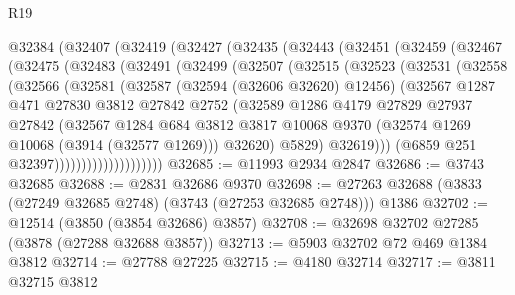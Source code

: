 \begin{lexlean}{R19}
\begin{coremodule}
    @32384
      (@32407
        (@32419
          (@32427
            (@32435
              (@32443
                (@32451
                  (@32459
                    (@32467
                      (@32475
                        (@32483
                          (@32491
                            (@32499
                              (@32507
                                (@32515
                                  (@32523
                                    (@32531
                                      (@32558
                                        (@32566
                                          (@32581
                                            (@32587
                                              (@32594 (@32606 @32620) @12456)
                                              (@32567
                                                @1287
                                                @471
                                                @27830
                                                @3812
                                                @27842
                                                @2752
                                                (@32589
                                                  @1286
                                                  @4179
                                                  @27829
                                                  @27937
                                                  @27842
                                                  (@32567
                                                    @1284
                                                    @684
                                                    @3812
                                                    @3817
                                                    @10068
                                                    @9370
                                                    (@32574 @1269 @10068 (@3914 (@32577 @1269)))
                                                    @32620)
                                                  @5829)
                                                @32619)))
                                          (@6859 @251 @32397))))))))))))))))))))
@32685 := @11993 @2934 @2847
@32686 := @3743 @32685
@32688 := @2831 @32686 @9370
@32698 := @27263 @32688 (@3833 (@27249 @32685 @2748) (@3743 (@27253 @32685 @2748))) @1386
@32702 := @12514 (@3850 (@3854 @32686) @3857)
@32708 := @32698 @32702 @27285 (@3878 (@27288 @32688 @3857))
@32713 := @5903 @32702 @72 @469 @1384 @3812
@32714 := @27788 @27225
@32715 := @4180 @32714
@32717 := @3811 @32715 @3812

\end{coremodule}
\end{lexlean}
